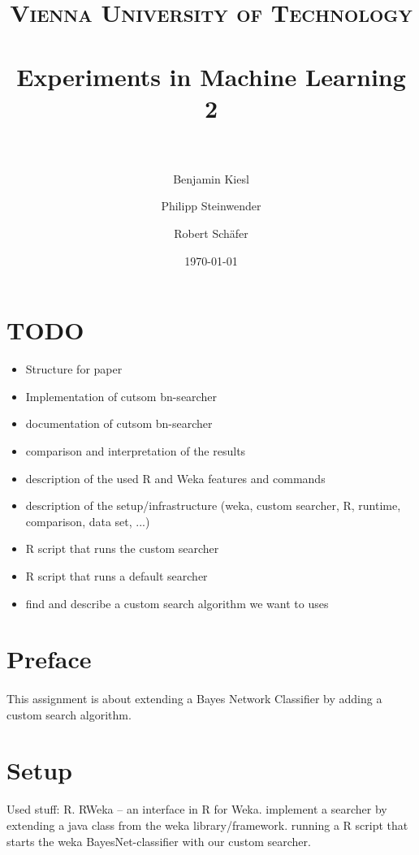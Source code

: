 \documentclass[paper=a4, fontsize=11pt]{scrartcl} %
\title{ 
\normalfont \normalsize 
\textsc{Vienna University of Technology} \\ [25pt] %
\horrule{0.5pt} \\[0.4cm] %
\huge Experiments in Machine Learning 2 \\ %
\horrule{2pt} \\[0.5cm] %
}
\author{Benjamin Kiesl \and Philipp Steinwender \and Robert Sch\"{a}fer} %
\date{\normalsize\today} %
\numberwithin{equation}{section} %
\numberwithin{figure}{section} %
\numberwithin{table}{section} %
\begin{document}
\maketitle %


\tableofcontents

\section{TODO}

\begin{itemize}
\item Structure for paper
\item Implementation of cutsom bn-searcher
\item documentation of cutsom bn-searcher
\item comparison and interpretation of the results
\item description of the used R and Weka features and commands
\item description of the setup/infrastructure (weka, custom searcher, R, runtime, comparison, data set, ...)
\item R script that runs the custom searcher
\item R script that runs a default searcher
\item find and describe a custom search algorithm we want to uses
\end{itemize}

\section{Preface}

\paragraph{}This assignment is about extending a Bayes Network Classifier by adding a custom search algorithm.

\section{Setup}

Used stuff: R. RWeka -- an interface in R for Weka. implement a searcher by extending a java class from the weka library/framework. running a R script that starts the weka BayesNet-classifier with our custom searcher.
\end{document}
